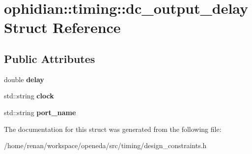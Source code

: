 \hypertarget{structophidian_1_1timing_1_1dc__output__delay}{\section{ophidian\-:\-:timing\-:\-:dc\-\_\-output\-\_\-delay Struct Reference}
\label{structophidian_1_1timing_1_1dc__output__delay}
}
\subsection*{Public Attributes}
\begin{DoxyCompactItemize}
\item 
\hypertarget{structophidian_1_1timing_1_1dc__output__delay_a5817ce5be0d8ff3a2b0ed115778de5c1}{double {\bfseries delay}}\label{structophidian_1_1timing_1_1dc__output__delay_a5817ce5be0d8ff3a2b0ed115778de5c1}

\item 
\hypertarget{structophidian_1_1timing_1_1dc__output__delay_a05b2de71eab4d3423ef16816641b301b}{std\-::string {\bfseries clock}}\label{structophidian_1_1timing_1_1dc__output__delay_a05b2de71eab4d3423ef16816641b301b}

\item 
\hypertarget{structophidian_1_1timing_1_1dc__output__delay_ad89255b944e212afbcbe2347d727ed9b}{std\-::string {\bfseries port\-\_\-name}}\label{structophidian_1_1timing_1_1dc__output__delay_ad89255b944e212afbcbe2347d727ed9b}

\end{DoxyCompactItemize}


The documentation for this struct was generated from the following file\-:\begin{DoxyCompactItemize}
\item 
/home/renan/workspace/openeda/src/timing/design\-\_\-constraints.\-h\end{DoxyCompactItemize}
